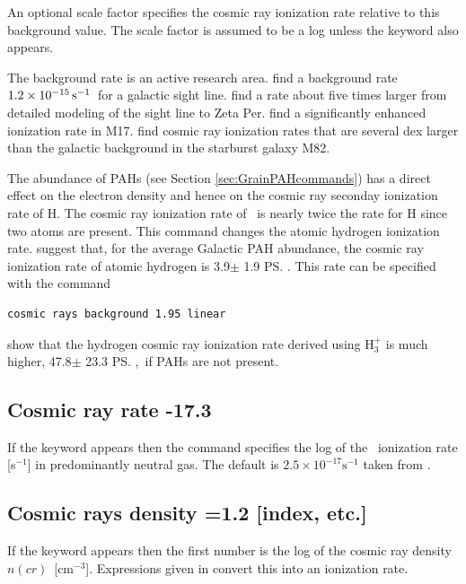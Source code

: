An optional scale factor specifies the cosmic ray ionization rate
relative to this background value.
The scale factor is assumed to be a
log unless the keyword  also appears.

The background rate is an active research area.
\citet{McCall2003} find a background rate
$1.2 \times 10^{-15} \mbox{${\rm\thinspace s}^{-1}\,$}$ for a galactic
sight line.
\citet{Shaw2008} find a rate about five times larger from detailed
modeling of the sight line to Zeta Per.
\citet{Pellegrini2007} find a significantly enhanced ionization rate in M17.
\citet{Suchkov1993} find cosmic ray ionization rates that are
several dex larger than the galactic background in the starburst galaxy M82. 

The abundance of PAHs (see Section \ref{sec:GrainPAHcommands}) has a
direct effect on the electron density and hence on the cosmic ray seconday
ionization rate of H.  The cosmic ray ionization rate of \htwo\ is nearly twice
the rate for H since two atoms are present.  This command changes the 
atomic hydrogen ionization rate.  
\citet{2021arXiv210103732S} suggest that, for the average Galactic PAH abundance, 
the cosmic ray ionization rate of
atomic hydrogen  is 3.9$\pm$ 1.9 \ps.
This rate can be  specified with the command
\begin{verbatim}
cosmic rays background 1.95 linear
\end{verbatim}
\citet{2021arXiv210103732S}  show that the hydrogen cosmic ray ionization rate derived using
H$_3^+$ is much higher, 47.8$\pm$ 23.3 \ps,\ if PAHs are not present.

\subsection{Cosmic ray rate -17.3}

If the keyword  appears then the command specifies
the log of the
\hO\ ionization rate [s$^{-1}$] in predominantly neutral gas.
The default is
$2.5\times 10^{-17} \mathrm{s}^{-1}$ taken from \citet{Williams1998}.

\subsection{Cosmic rays density =1.2 [index, etc.]}

If the keyword  appears then the first number
is the log of the
cosmic ray density $n(cr)$~[cm$^{-3}$].
Expressions given in \citet{FerlandMushotzky1984} convert this into an ionization rate.

